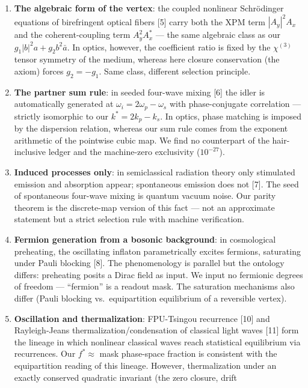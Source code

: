 \documentclass[
  a4paper,
]{article}
\providecommand{\tightlist}{%
  \setlength{\itemsep}{0pt}\setlength{\parskip}{0pt}}
\begin{document}
\begin{enumerate}
\def\labelenumi{\arabic{enumi}.}
\tightlist
\item
  \textbf{The algebraic form of the vertex}: the coupled nonlinear
  Schrödinger equations of birefringent optical fibers {[}5{]} carry
  both the XPM term \(|A_y|^2A_x\) and the coherent-coupling term
  \(A_y^2 A_x^*\) --- the same algebraic class as our
  \(g_1|b|^2a + g_2 b^2\bar a\). In optics, however, the coefficient
  ratio is fixed by the \(\chi^{(3)}\) tensor symmetry of the medium,
  whereas here closure conservation (the axiom) forces \(g_2=-g_1\).
  Same class, different selection principle.
\item
  \textbf{The partner sum rule}: in seeded four-wave mixing {[}6{]} the
  idler is automatically generated at
  \(\omega_i = 2\omega_p - \omega_s\) with phase-conjugate correlation
  --- strictly isomorphic to our \(k^* = 2k_p - k_s\). In optics, phase
  matching is imposed by the dispersion relation, whereas our sum rule
  comes from the exponent arithmetic of the pointwise cubic map. We find
  no counterpart of the hair-inclusive ledger and the machine-zero
  exclusivity (\(10^{-27}\)).
\item
  \textbf{Induced processes only}: in semiclassical radiation theory
  only stimulated emission and absorption appear; spontaneous emission
  does not {[}7{]}. The seed of spontaneous four-wave mixing is quantum
  vacuum noise. Our parity theorem is the discrete-map version of this
  fact --- not an approximate statement but a strict selection rule with
  machine verification.
\item
  \textbf{Fermion generation from a bosonic background}: in cosmological
  preheating, the oscillating inflaton parametrically excites fermions,
  saturating under Pauli blocking {[}8{]}. The phenomenology is parallel
  but the ontology differs: preheating posits a Dirac field as input. We
  input no fermionic degrees of freedom --- ``fermion'' is a readout
  mask. The saturation mechanisms also differ (Pauli blocking
  vs.~equipartition equilibrium of a reversible vertex).
\item
  \textbf{Oscillation and thermalization}: FPU-Tsingou recurrence
  {[}10{]} and Rayleigh-Jeans thermalization/condensation of classical
  light waves {[}11{]} form the lineage in which nonlinear classical
  waves reach statistical equilibrium via recurrences. Our
  \(f^*\approx\) mask phase-space fraction is consistent with the
  equipartition reading of this lineage. However, thermalization under
  an exactly conserved quadratic invariant (the zero closure, drift

\end{enumerate}
\end{document}
